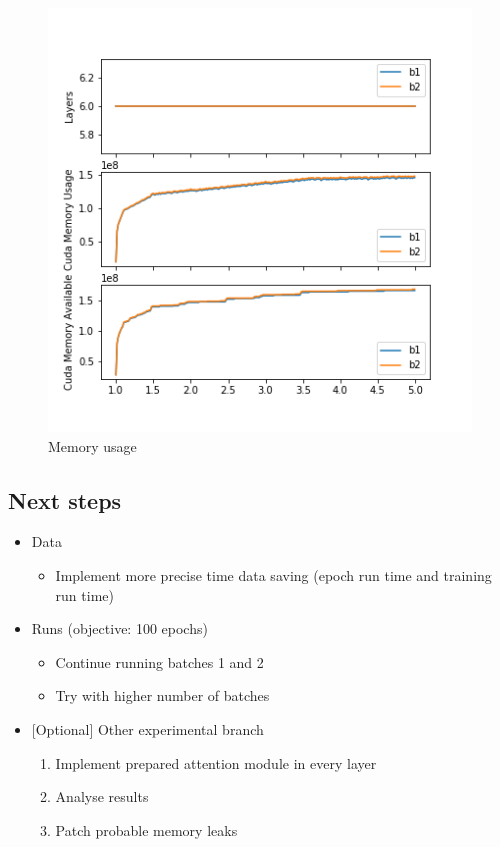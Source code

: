 \begin{figure}
\centering
\includegraphics{2018_06_15_memory.png}
\caption{Memory usage}
\end{figure}

\subsection{Next steps}\label{next-steps}

\begin{itemize}
\tightlist
\item
  Data

  \begin{itemize}
  \tightlist
  \item
    Implement more precise time data saving (epoch run time and training
    run time)
  \end{itemize}
\item
  Runs (objective: 100 epochs)

  \begin{itemize}
  \tightlist
  \item
    Continue running batches 1 and 2
  \item
    Try with higher number of batches
  \end{itemize}
\item
  {[}Optional{]} Other experimental branch

  \begin{enumerate}
  \def\labelenumi{\arabic{enumi}.}
  \tightlist
  \item
    Implement prepared attention module in every layer
  \item
    Analyse results
  \item
    Patch probable memory leaks
  \end{enumerate}
\end{itemize}
